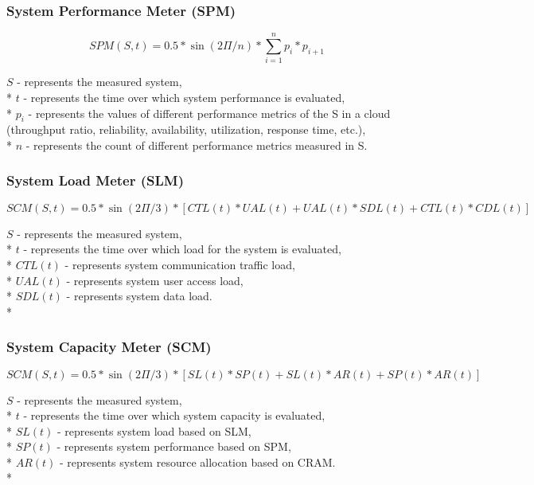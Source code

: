 \documentclass{uvamscse}
\begin{document}
\subsubsection{System Performance Meter (SPM)}
\begin{center}
  $$SPM(S,t) = 0.5 * \sin(2\Pi/n) * \sum_{i=1}^{n}p_i*p_{i+1}$$
\end{center}
  \texttt{$S$} - represents the measured system, \\*
  \texttt{$t$} - represents the time over which system performance is evaluated, \\*
  \texttt{$p_i$} - represents the values of different performance metrics of the S in a cloud  (throughput ratio, reliability, availability, utilization, response time, etc.), \\*
  \texttt{$n$} - represents the count of different performance metrics measured in S.

\subsubsection{System Load Meter (SLM)}
\begin{center}
  $$SCM(S,t) = 0.5 * \sin(2\Pi/3) * [CTL(t)*UAL(t)+UAL(t)*SDL(t)+CTL(t)*CDL(t)]$$
\end{center}
  \texttt{$S$} - represents the measured system, \\*
  \texttt{$t$} - represents the time over which load for the system is evaluated, \\*
  \texttt{$CTL(t)$} - represents system communication traffic load, \\*
  \texttt{$UAL(t)$} - represents system user access load, \\*
  \texttt{$SDL(t)$} - represents system data load. \\*

\subsubsection{System Capacity Meter (SCM)}
\begin{center}
  $$SCM(S,t) = 0.5 * \sin(2\Pi/3) * [SL(t)*SP(t)+SL(t)*AR(t)+SP(t)*AR(t)]$$
\end{center}
  \texttt{$S$} - represents the measured system, \\*
  \texttt{$t$} - represents the time over which system capacity is evaluated, \\*
  \texttt{$SL(t)$} - represents system load based on SLM, \\*
  \texttt{$SP(t)$} - represents system performance based on SPM, \\*
  \texttt{$AR(t)$} - represents system resource allocation based on CRAM. \\*
\end{document}
